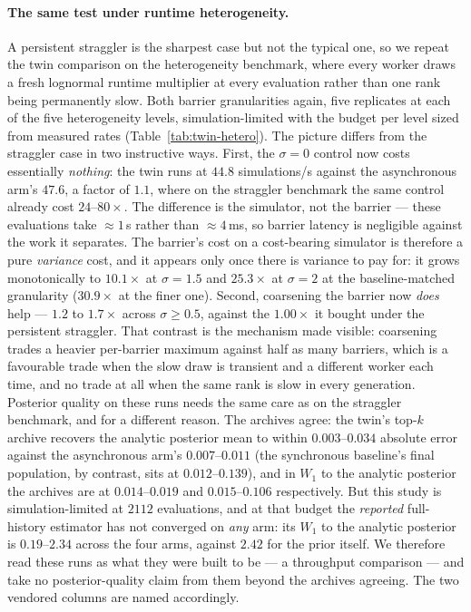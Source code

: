 \paragraph{The same test under runtime heterogeneity.} A persistent straggler is the sharpest case but not the typical one, so we repeat the twin comparison on the heterogeneity benchmark, where every worker draws a fresh lognormal runtime multiplier at every evaluation rather than one rank being permanently slow. Both barrier granularities again, five replicates at each of the five heterogeneity levels, simulation-limited with the budget per level sized from measured rates (Table~\ref{tab:twin-hetero}). The picture differs from the straggler case in two instructive ways. First, the $\sigma{=}0$ control now costs essentially \emph{nothing}: the twin runs at $44.8$ simulations/s against the asynchronous arm's $47.6$, a factor of $1.1$, where on the straggler benchmark the same control already cost $24$--$80\times$. The difference is the simulator, not the barrier --- these evaluations take ${\approx}1$\,s rather than ${\approx}4$\,ms, so barrier latency is negligible against the work it separates. The barrier's cost on a cost-bearing simulator is therefore a pure \emph{variance} cost, and it appears only once there is variance to pay for: it grows monotonically to $10.1\times$ at $\sigma{=}1.5$ and $25.3\times$ at $\sigma{=}2$ at the baseline-matched granularity ($30.9\times$ at the finer one). Second, coarsening the barrier now \emph{does} help --- $1.2$ to $1.7\times$ across $\sigma\ge0.5$, against the $1.00\times$ it bought under the persistent straggler. That contrast is the mechanism made visible: coarsening trades a heavier per-barrier maximum against half as many barriers, which is a favourable trade when the slow draw is transient and a different worker each time, and no trade at all when the same rank is slow in every generation. Posterior quality on these runs needs the same care as on the straggler benchmark, and for a different reason. The archives agree: the twin's top-$k$ archive recovers the analytic posterior mean to within $0.003$--$0.034$ absolute error against the asynchronous arm's $0.007$--$0.011$ (the synchronous baseline's final population, by contrast, sits at $0.012$--$0.139$), and in $W_1$ to the analytic posterior the archives are at $0.014$--$0.019$ and $0.015$--$0.106$ respectively. But this study is simulation-limited at $2112$ evaluations, and at that budget the \emph{reported} full-history estimator has not converged on \emph{any} arm: its $W_1$ to the analytic posterior is $0.19$--$2.34$ across the four arms, against $2.42$ for the prior itself. We therefore read these runs as what they were built to be --- a throughput comparison --- and take no posterior-quality claim from them beyond the archives agreeing. The two vendored columns are named accordingly.

